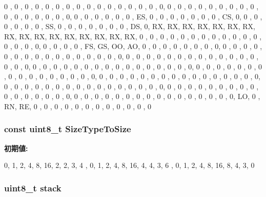 \begin{DoxyCode}

    {    

 0 , 0 , 0 , 0 , 0 , 0 , 0 , 0 , 0 , 0 , 0 , 0 , 0 , 0 , 0 , 0,
 0 , 0 , 0 , 0 , 0 , 0 , 0 , 0 , 0 , 0 , 0 , 0 , 0 , 0 , 0 , 0,
 0 , 0 , 0 , 0 , 0 , 0 , ES, 0 , 0 , 0 , 0 , 0 , 0 , 0 , CS, 0,
 0 , 0 , 0 , 0 , 0 , 0 , SS, 0 , 0 , 0 , 0 , 0 , 0 , 0 , DS, 0,
 RX, RX, RX, RX, RX, RX, RX, RX, RX, RX, RX, RX, RX, RX, RX, RX,
 0 , 0 , 0 , 0 , 0 , 0 , 0 , 0 , 0 , 0 , 0 , 0 , 0 , 0 , 0 , 0,
 0 , 0 , 0 , 0 , FS, GS, OO, AO, 0 , 0 , 0 , 0 , 0 , 0 , 0 , 0,
 0 , 0 , 0 , 0 , 0 , 0 , 0 , 0 , 0 , 0 , 0 , 0 , 0 , 0 , 0 , 0,
 0 , 0 , 0 , 0 , 0 , 0 , 0 , 0 , 0 , 0 , 0 , 0 , 0 , 0 , 0 , 0,
 0 , 0 , 0 , 0 , 0 , 0 , 0 , 0 , 0 , 0 , 0 , 0 , 0 , 0 , 0 , 0,
 0 , 0 , 0 , 0 , 0 , 0 , 0 , 0 , 0 , 0 , 0 , 0 , 0 , 0 , 0 , 0,
 0 , 0 , 0 , 0 , 0 , 0 , 0 , 0 , 0 , 0 , 0 , 0 , 0 , 0 , 0 , 0,
 0 , 0 , 0 , 0 , 0 , 0 , 0 , 0 , 0 , 0 , 0 , 0 , 0 , 0 , 0 , 0,
 0 , 0 , 0 , 0 , 0 , 0 , 0 , 0 , 0 , 0 , 0 , 0 , 0 , 0 , 0 , 0,
 0 , 0 , 0 , 0 , 0 , 0 , 0 , 0 , 0 , 0 , 0 , 0 , 0 , 0 , 0 , 0,
 LO, 0 , RN, RE, 0 , 0 , 0 , 0 , 0 , 0 , 0 , 0 , 0 , 0 , 0 , 0
    }
\end{DoxyCode}
\hypertarget{classX86ISA_1_1Decoder_a30eeeb2cd279f8cfcbafbd9873691d2f}{
\subsubsection[{SizeTypeToSize}]{\setlength{\rightskip}{0pt plus 5cm}const uint8\_\-t {\bf SizeTypeToSize}}}
\label{classX86ISA_1_1Decoder_a30eeeb2cd279f8cfcbafbd9873691d2f}
{\bfseries 初期値:}
\begin{DoxyCode}

    {

        {0,    1,   2,   4,    8,    16,   2,    2,    3,    4      }, 
        {0,    1,   2,   4,    8,    16,   4,    4,    3,    6      }, 
        {0,    1,   2,   4,    8,    16,   8,    4,    3,    0      }  
    }
\end{DoxyCode}
\hypertarget{classX86ISA_1_1Decoder_aef01e995775f4a7ba2367414f311dc73}{
\subsubsection[{stack}]{\setlength{\rightskip}{0pt plus 5cm}uint8\_\-t {\bf stack}}}
